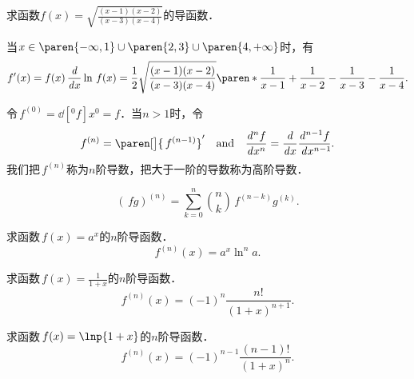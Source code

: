 \begin{example*}
  求函数\(f(x) = \sqrt{\frac{(x-1)(x-2)}{(x-3)(x-4)}}\)的导函数．
  \begin{remark}
    当\(x \in \paren{-\infty,1} \cup \paren{2,3} \cup \paren{4,+\infty}\)时，有
    \begin{equation*}
      f'(x)
      = f(x) \,\ddx \ln\,f(x)
      = \frac12
      \sqrt{\frac{(x-1)(x-2)}{(x-3)(x-4)}}
      \paren*{\frac1{x-1} + \frac1{x-2} - \frac1{x-3} - \frac1{x-4}}.
    \end{equation*}
  \end{remark}
\end{example*}

\begin{definition*}[高阶导数]
  \label{defn:derivhio}
  令\(\,f^{(0)} = \dd[^0f]{x^0} = f\)．当\(n > 1\)时，令
  \begin{equation*}
    f^{(n)} = \paren[\big]{\,f^{(n-1)}}'
    \qand
    \dd[^nf]{x^n} = \ddx \dd[^{n-1}f]{x^{n-1}\negthickspace}.
  \end{equation*}
  我们把\(\,f^{(n)}\)称为\(n\)阶导数，把大于一阶的导数称为高阶导数．
\end{definition*}

\begin{theorem*}[莱布尼茨公式]
  \begin{equation*}
    (\,fg)^{(n)} = \sum_{k=0}^n \binom nk \,f^{(n-k)} g^{(k)}.
  \end{equation*}
\end{theorem*}

\begin{example*}
  求函数\(\,f(x) = a^x\)的\(n\)阶导函数．
  \begin{equation*}
    f^{(n)}(x) = a^x \ln^n a.
  \end{equation*}
\end{example*}

\begin{example*}
  求函数\(\,f(x) = \frac1{1+x}\)的\(n\)阶导函数．
  \begin{equation*}
    f^{(n)}(x) = (-1)^n \frac{n!}{(1+x)^{n+1}}.
  \end{equation*}
\end{example*}

\begin{example*}
  求函数\(\,f(x) = \lnp{1+x}\)的\(n\)阶导函数．
  \begin{equation*}
    f^{(n)}(x) = (-1)^{n-1} \frac{(n-1)!}{(1+x)^n}.
  \end{equation*}
\end{example*}

